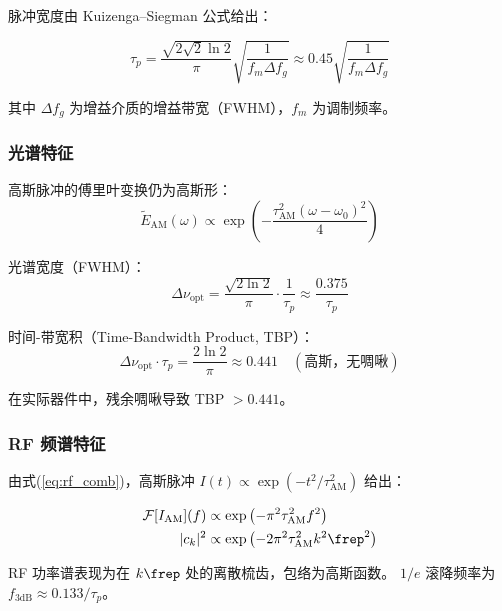 \documentclass[11pt,a4paper]{article}
\newcommand{\FT}{\mathcal{F}}
\begin{document}
脉冲宽度由 Kuizenga--Siegman 公式给出：

\begin{equation}\label{eq:ks_formula}
\tau_p = \frac{\sqrt{2\sqrt{2} \ln 2}}{\pi} \sqrt{\frac{1}{f_m \Delta f_g}} \approx 0.45 \sqrt{\frac{1}{f_m \Delta f_g}}
\end{equation}

其中 $\Delta f_g$ 为增益介质的增益带宽（FWHM），$f_m$ 为调制频率。

\subsubsection{光谱特征}

高斯脉冲的傅里叶变换仍为高斯形：
\begin{equation}\label{eq:gaussian_spectrum}
\tilde{E}_{\text{AM}}(\omega) \propto \exp\left(-\frac{\tau_{\text{AM}}^2 (\omega - \omega_0)^2}{4}\right)
\end{equation}

光谱宽度（FWHM）：
\begin{equation}\label{eq:gaussian_bw}
\Delta \nu_{\text{opt}} = \frac{\sqrt{2\ln 2}}{\pi} \cdot \frac{1}{\tau_p} \approx \frac{0.375}{\tau_p}
\end{equation}

时间-带宽积（Time-Bandwidth Product, TBP）：
\begin{equation}\label{eq:tbp_gaussian}
\Delta \nu_{\text{opt}} \cdot \tau_p = \frac{2\ln 2}{\pi} \approx 0.441 \quad (\text{高斯，无啁啾})
\end{equation}

在实际器件中，残余啁啾导致 TBP $> 0.441$。

\subsubsection{RF 频谱特征}

由式(\ref{eq:rf_comb})，高斯脉冲 $I(t) \propto \exp(-t^2/\tau_{\text{AM}}^2)$ 给出：

\begin{equation}\label{eq:am_rf_envelope}
\begin{aligned}
\FT[I_{\text{AM}}](f) &\propto \exp\left(-\pi^2 \tau_{\text{AM}}^2 f^2\right) \\
|c_k|^2 &\propto \exp\left(-2\pi^2 \tau_{\text{AM}}^2 k^2 \frep^2\right)
\end{aligned}
\end{equation}

RF 功率谱表现为在 $k\frep$ 处的离散梳齿，包络为高斯函数。
$1/e$ 滚降频率为 $f_{3\text{dB}} \approx 0.133 / \tau_p$。
\end{document}
